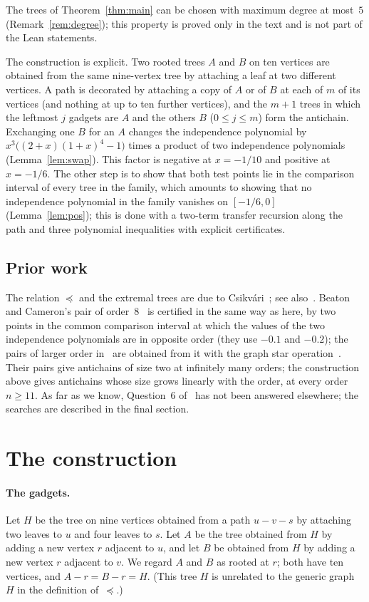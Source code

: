 \documentclass[11pt]{article}
\theoremstyle{definition}
\theoremstyle{remark}
\begin{document}
\noindent The trees of Theorem~\ref{thm:main} can be chosen with maximum
degree at most~$5$ (Remark~\ref{rem:degree}); this property is proved only in
the text and is not part of the Lean statements.

The construction is explicit. Two rooted trees $A$ and $B$ on ten vertices are
obtained from the same nine-vertex tree by attaching a leaf at two different
vertices. A path is decorated by attaching a copy of $A$ or of $B$ at each of
$m$ of its vertices (and nothing at up to ten further vertices), and the
$m+1$ trees in which the leftmost $j$ gadgets are $A$ and the others $B$
($0\le j\le m$) form the antichain. Exchanging one $B$ for an $A$ changes the
independence polynomial by $x^3\bigl((2+x)(1+x)^4-1\bigr)$ times a product of
two independence polynomials (Lemma~\ref{lem:swap}). This factor is negative
at $x=-1/10$ and positive at $x=-1/6$. The other step is to show that both test
points lie in the comparison interval of every tree in the family, which
amounts to showing that no independence polynomial in the family vanishes on
$[-1/6,0]$ (Lemma~\ref{lem:pos}); this is done with a two-term transfer
recursion along the path and three polynomial inequalities with explicit
certificates.

\subsection*{Prior work}
The relation $\preceq$ and the extremal trees are due to Csikvári~\cite{cs};
see also~\cite{ob}. Beaton and Cameron's pair of order~$8$~\cite[Figure~16]{bc} is
certified in the same way as here, by two points in the common comparison
interval at which the values of the two independence polynomials are in
opposite order (they use $-0.1$ and $-0.2$); the pairs of larger order
in~\cite[Theorem~16]{bc} are obtained from it with the graph star
operation~\cite[Lemma~2]{bc}. Their pairs give antichains of size two at infinitely many orders;
the construction above gives antichains whose size grows linearly with the
order, at every order $n\ge11$. As far as we know, Question~6 of~\cite{bc}
has not been answered elsewhere; the searches are described in the final
section.

\section{The construction}\label{sec:construction}

\paragraph{The gadgets.}
Let $H$ be the tree on nine vertices obtained from a path $u - v - s$ by
attaching two leaves to $u$ and four leaves to $s$. Let $A$ be the tree
obtained from $H$ by adding a new vertex $r$ adjacent to $u$, and let $B$ be
obtained from $H$ by adding a new vertex $r$ adjacent to $v$. We regard $A$
and $B$ as rooted at $r$; both have ten vertices, and $A-r=B-r=H$. (This
tree $H$ is unrelated to the generic graph $H$ in the definition
of~$\preceq$.)
\end{document}
